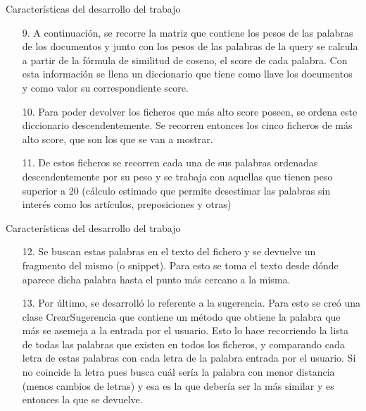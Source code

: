 \documentclass[11pt]{beamer}
\begin{document}
	\begin{frame}{Características del desarrollo del trabajo}
		\begin{enumerate}
			
			\item[9.] A continuación, se recorre la matriz que contiene los pesos de las palabras de los documentos y junto con los pesos de las palabras de la query se calcula a partir de la fórmula de similitud de coseno, el score de cada palabra.
			Con esta información se llena un diccionario que tiene como llave los documentos y como valor su correspondiente score.
			
			\item[10.] Para poder devolver los ficheros que más alto score poseen, se ordena este diccionario descendentemente. Se recorren entonces los cinco ficheros de más alto score, que son los que se van a mostrar.
			
			\item[11.] De estos ficheros se recorren cada una de sus palabras ordenadas descendentemente por su peso y se trabaja con aquellas que tienen peso superior a 20 (cálculo estimado que permite desestimar las palabras sin interés como los artículos, preposiciones y otras)
		\end{enumerate}
	\end{frame}
	
	\begin{frame}{Características del desarrollo del trabajo}
		\begin{enumerate}
			
			\item[12.] Se buscan estas palabras en el texto del fichero y se devuelve un fragmento del mismo (o snippet). Para esto se toma el texto desde dónde aparece dicha palabra hasta el punto más cercano a la misma.
			
			\item[13.] Por último, se desarrolló lo referente a la sugerencia. Para esto se creó una clase CrearSugerencia que contiene un método que obtiene la palabra que más se asemeja a la entrada por el usuario. 
			Esto lo hace recorriendo la lista de todas las palabras que existen en todos los ficheros, y comparando cada letra de estas palabras con cada letra de la palabra entrada por el usuario. Si no coincide la letra pues busca cuál sería la palabra con menor distancia (menos cambios de letras) y esa es la que debería ser la más similar y es entonces la que se devuelve.
		\end{enumerate}
	\end{frame}
\end{document}
